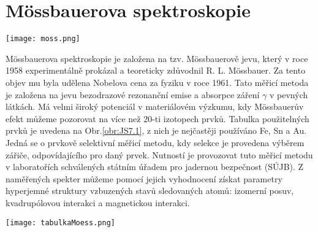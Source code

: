 \documentclass[../../main.tex]{subfiles}
\begin{document}
\chapter{Mössbauerova spektroskopie}

\begin{center}
	\texttt{[image: moss.png]}
\end{center}

Mössbauerova spektroskopie je založena na tzv. Mössbauerově jevu, který v roce 1958 experimentálně prokázal a teoreticky zdůvodnil R. L. Mössbauer. Za tento objev mu byla udělena Nobelova cena za fyziku v roce 1961. Tato měřicí metoda je založena na jevu bezodrazové rezonanční emise a absorpce záření $\gamma$ v pevných látkách. Má velmi široký potenciál v materiálovém výzkumu, kdy Mössbauerův efekt můžeme pozorovat na více než 20-ti izotopech prvků. Tabulka použitelných prvků je uvedena na Obr.\ref{obr:JS7.1}, z nich je nejčastěji používáno Fe, Sn a Au. Jedná se o prvkově selektivní měřicí metodu, kdy selekce je provedena výběrem zářiče, odpovídajícího pro daný prvek. Nutností je provozovat tuto měřicí metodu v laboratořích schválených státním úřadem pro jadernou bezpečnost (SÚJB). Z naměřených spekter můžeme pomocí jejich vyhodnocení získat parametry hyperjemné struktury vzbuzených stavů sledovaných atomů: izomerní posuv, kvadrupólovou interakci a magnetickou interakci. 


\begin{center}
	\texttt{[image: tabulkaMoess.png]}
\end{center}
\end{document}
